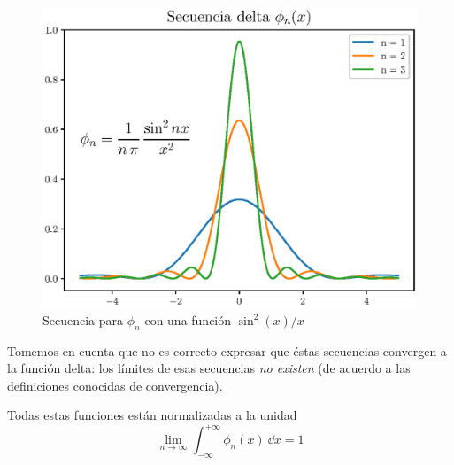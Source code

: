 \begin{figure}[H]
    \centering
    \includegraphics[scale=0.8]{Imagenes/secuencia_delta_03.eps}
    \caption{Secuencia para $\phi_{n}$ con una función $\sin^{2}(x)/x$}
    \label{fig:plot_secuencia_03}
\end{figure}



Tomemos en cuenta que no es correcto expresar que éstas secuencias convergen a la función delta: los límites de esas secuencias \emph{no existen} (de acuerdo a las definiciones conocidas de convergencia).

Todas estas funciones están normalizadas a la unidad
\begin{equation}
\lim_{n \to \infty} \int_{- \infty}^{+ \infty} \phi_{n}(x) \: \dd{x} = 1
\label{eq:ecuacion_delta_05}
\end{equation}

